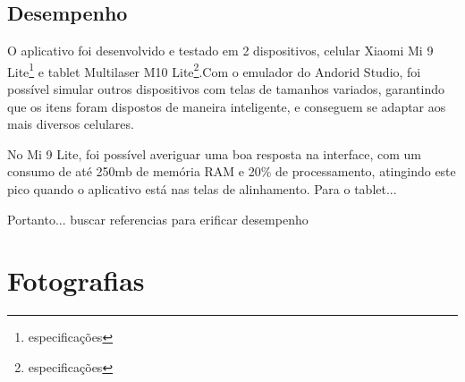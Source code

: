 \subsection{Desempenho}
O aplicativo foi desenvolvido e testado em 2 dispositivos, celular Xiaomi Mi 9 Lite\footnote{especificações} e tablet Multilaser M10 Lite\footnote{especificações}.Com o emulador do Andorid Studio, foi possível simular outros dispositivos com telas de tamanhos variados, garantindo que os itens foram dispostos de maneira inteligente, e conseguem se adaptar aos mais diversos celulares. 

No Mi 9 Lite, foi possível averiguar uma boa resposta na interface, com um consumo de até 250mb de memória RAM e 20\% de processamento, atingindo este pico quando o aplicativo está nas telas de alinhamento. Para o tablet...

Portanto...
buscar referencias para erificar desempenho


\section{Fotografias}